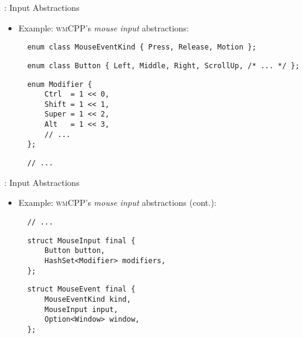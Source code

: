 \begin{frame}[fragile]{\underline{\cpp}: Input Abstractions \hfill {\footnotesize \currentname}}


    \begin{itemize}

        \item Example: \textsc{wmCPP}'s \textit{mouse input} abstractions:\\[3pt]
\begin{verbatim}
  enum class MouseEventKind { Press, Release, Motion };
\end{verbatim}
\begin{verbatim}
  enum class Button { Left, Middle, Right, ScrollUp, /* ... */ };
\end{verbatim}
\begin{verbatim}
  enum Modifier {
      Ctrl  = 1 << 0,
      Shift = 1 << 1,
      Super = 1 << 2,
      Alt   = 1 << 3,
      // ...
  };
\end{verbatim}
\begin{verbatim}
  // ...
\end{verbatim}

    \end{itemize}

    \vfill

\end{frame}

\begin{frame}[fragile]{\underline{\cpp}: Input Abstractions \hfill {\footnotesize \currentname}}


    \begin{itemize}

        \item Example: \textsc{wmCPP}'s \textit{mouse input} abstractions (cont.):\\[3pt]
\begin{verbatim}
  // ...
\end{verbatim}
\begin{verbatim}
  struct MouseInput final {
      Button button,
      HashSet<Modifier> modifiers,
  };
\end{verbatim}
\begin{verbatim}
  struct MouseEvent final {
      MouseEventKind kind,
      MouseInput input,
      Option<Window> window,
  };
\end{verbatim}

    \end{itemize}

    \vfill

\end{frame}

